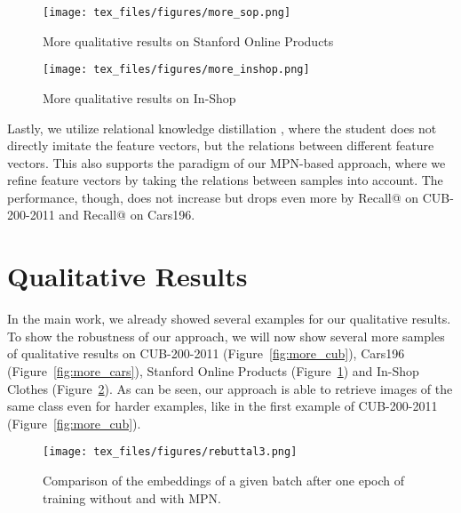 \documentclass{article}
\begin{document}
\begin{figure}[ht]
    \begin{center}
    \centerline{\texttt{[image: tex\_files/figures/more\_sop.png]}}
    \caption{More qualitative results on Stanford Online Products}
    \label{fig:more_sop}
    \end{center}
\end{figure}
\begin{figure}[ht]
    \begin{center}
    \centerline{\texttt{[image: tex\_files/figures/more\_inshop.png]}}
    \caption{More qualitative results on In-Shop}
    \label{fig:more_inshop}
    \end{center}
    \vspace{-0.5cm}
\end{figure} 
 
 Lastly, we utilize relational knowledge distillation \cite{DBLP:conf/cvpr/ParkKLC19}, where the student does not directly imitate the feature vectors, but the relations between different feature vectors. This also supports the paradigm of our MPN-based approach, where we refine feature vectors by taking the relations between samples into account. The performance, though, does not increase but drops even more by  Recall@ on CUB-200-2011 and  Recall@ on Cars196. 



\section{Qualitative Results}
\label{sec:quali}
In the main work, we already showed several examples for our qualitative results. To show the robustness of our approach, we will now show several more samples of qualitative results on CUB-200-2011 (Figure~\ref{fig:more_cub}), Cars196 (Figure~\ref{fig:more_cars}), Stanford Online Products (Figure~\ref{fig:more_sop}) and In-Shop Clothes (Figure~\ref{fig:more_inshop}). As can be seen, our approach is able to retrieve images of the same class even for harder examples, like in the first example of CUB-200-2011 (Figure~\ref{fig:more_cub}). 

\begin{figure*}
    \centering
    \texttt{[image: tex\_files/figures/rebuttal3.png]}
    \caption{Comparison of the embeddings of a given batch after one epoch of training without and with MPN.}
    \label{fig:epoch_comp}
\end{figure*}
\end{document}
